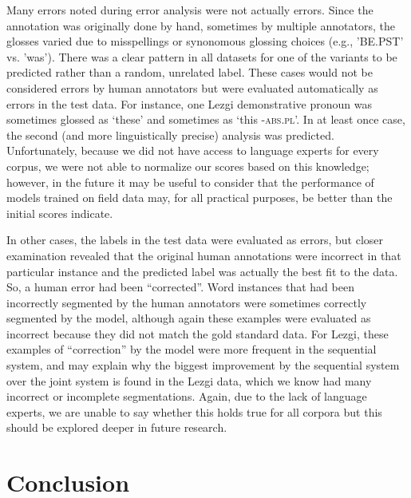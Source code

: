 Many errors noted during error analysis were not actually errors. Since the annotation was originally done by hand, sometimes by multiple annotators, the glosses varied due to misspellings or synonomous glossing choices (e.g., 'BE.PST' vs. 'was'). There was a clear pattern in all datasets for one of the variants to be predicted rather than a random, unrelated label. These cases would not be considered errors by human annotators but were evaluated automatically as errors in the test data. For instance, one Lezgi demonstrative pronoun was sometimes glossed as `these' and sometimes as `this \textsc{-abs.pl}'. In at least once case, the second (and more linguistically precise) analysis was predicted. Unfortunately, because we did not have access to language experts for every corpus, we were not able to normalize our scores based on this knowledge; however, in the future it may be useful to consider that the performance of models trained on field data may, for all practical purposes, be better than the initial scores indicate.

In other cases, the labels in the test data were evaluated as errors, but closer examination revealed that the original human annotations were incorrect in that particular instance and the predicted label was actually the best fit to the data. So, a human error had been ``corrected''. 
Word instances that had been incorrectly segmented by the human annotators were sometimes correctly segmented by the model, although again these examples were evaluated as incorrect because they did not match the gold standard data. For Lezgi, these examples of ``correction'' by the model were more frequent in the sequential system, and may explain why the biggest improvement by the sequential system over the joint system is found in the Lezgi data, which we know had many incorrect or incomplete segmentations.  Again, due to the lack of language experts, we are unable to say whether this holds true for all corpora but this should be explored deeper in future research.


\section{Conclusion}
\label{sec:sgconclusion}

